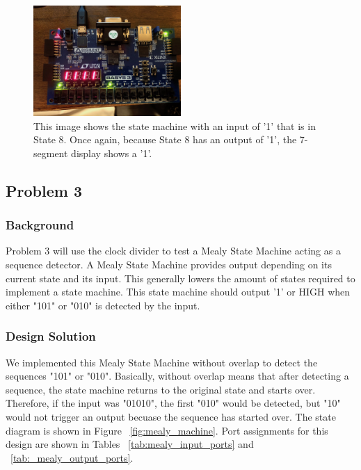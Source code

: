 \documentclass[11pt]{article}
\begin{document}
\begin{center}
\begin{figure}[H]
	\includegraphics[width=0.5\textwidth]{./images/Part2/IMG_0582.jpg}
	\caption{\label{fig:part2img5}This image shows the state machine with an input of '1' that is in State 8. Once again, because State 8 has an output of '1', the 7-segment display shows a '1'.}
\end{figure}
\end{center}

\subsection{Problem 3}

\subsubsection{Background}
Problem 3 will use the clock divider to test a Mealy State Machine acting as a sequence detector. A Mealy State Machine provides output depending on its current state and its input. This generally lowers the amount of states required to implement a state machine. This state machine should output '1' or HIGH when either "101" or "010" is detected by the input.

\subsubsection{Design Solution}
We implemented this Mealy State Machine without overlap to detect the sequences "101" or "010". Basically, without overlap means that after detecting a sequence, the state machine returns to the original state and starts over. Therefore, if the input was "01010", the first "010" would be detected, but "10" would not trigger an output becuase the sequence has started over. The state diagram is shown in Figure ~\ref{fig:mealy_machine}. Port assignments for this design are shown in Tables ~\ref{tab:mealy_input_ports} and ~\ref{tab:_mealy_output_ports}.
\end{document}
